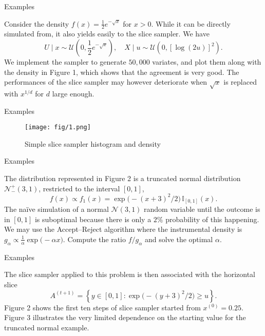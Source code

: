 \documentclass{beamer}
\begin{document}
\begin{frame}{Examples}
	\begin{example}
		Consider the density $f(x)=\frac{1}{2} e^{-\sqrt{x}}$ for $x>0$. While it can be directly simulated from, it also yields easily to the slice sampler. We have
		$$
		U \mid x \sim \mathcal{U}\left(0, \frac{1}{2} e^{-\sqrt{x}}\right), \quad X \mid u \sim \mathcal{U}\left(0,[\log (2 u)]^{2}\right).
		$$
		We implement the sampler to generate $50,000$ variates, and plot them along with the density in Figure 1, which shows that the agreement is very good. The performances of the slice sampler may however deteriorate when $\sqrt{x}$ is replaced with $x^{1 / d}$ for $d$ large enough.
	\end{example}
\end{frame}
\begin{frame}{Examples}
	\begin{figure}[htbp]
		\texttt{[image: fig/1.png]}
		\caption{Simple slice sampler histogram and density}
	\end{figure}
\end{frame}
\begin{frame}{Examples}
	\begin{example}
	The distribution represented in Figure 2 is a truncated normal distribution $\mathcal{N}_{-}^{+}(3,1)$, restricted to the interval $[0,1]$,
	$$
	f(x) \propto f_{1}(x)=\exp \bigl(-(x+3)^{2} / 2\bigr) \, \mathbb{I}_{[0,1]}(x).
	$$
	The naïve simulation of a normal $\mathcal{N}(3,1)$ random variable until the outcome is in $[0,1]$ is suboptimal because there is only a $2 \%$ probability of this happening. We may use the Accept--Reject algorithm where the instrumental density is $g_\alpha \propto \frac{1}{\alpha} \exp \bigl(-\alpha x \bigr)$. Compute the ratio $f/g_\alpha$ and solve the optimal $\alpha$.
	\end{example}
\end{frame}
\begin{frame}{Examples}
	\begin{example}
	The slice sampler applied to this problem is then associated with the horizontal slice
	$$
	A^{(t+1)}=\left\{y \in [0,1] : \exp \bigl(-(y+3)^{2} / 2\bigr) \geq u \right\}. 
	$$
	Figure 2 shows the first ten steps of slice sampler started from $x^{(0)}=0.25$. Figure 3 illustrates the very limited dependence on the starting value for the truncated normal example.
\end{example}
\end{frame}
\end{document}
